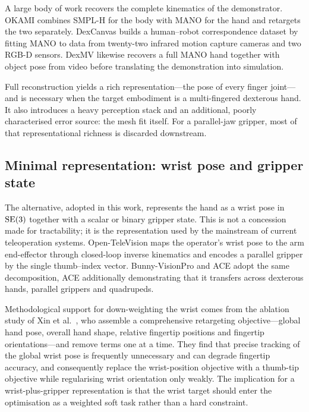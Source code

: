 A large body of work recovers the complete kinematics of the demonstrator.
OKAMI \cite{okami} combines SMPL-H for the body with MANO for the hand and
retargets the two separately. DexCanvas \cite{dexcanvas} builds a human--robot
correspondence dataset by fitting MANO to data from twenty-two infrared motion
capture cameras and two RGB-D sensors. DexMV \cite{dexmv} likewise recovers a
full MANO hand together with object pose from video before translating the
demonstration into simulation.

Full reconstruction yields a rich representation---the pose of every finger
joint---and is necessary when the target embodiment is a multi-fingered
dexterous hand. It also introduces a heavy perception stack and an additional,
poorly characterised error source: the mesh fit itself. For a parallel-jaw
gripper, most of that representational richness is discarded downstream.

\subsection{Minimal representation: wrist pose and gripper state}

The alternative, adopted in this work, represents the hand as a wrist pose in
$\mathrm{SE}(3)$ together with a scalar or binary gripper state. This is not a concession
made for tractability; it is the representation used by the mainstream of
current teleoperation systems. Open-TeleVision \cite{opentv} maps the operator's
wrist pose to the arm end-effector through closed-loop inverse kinematics and
encodes a parallel gripper by the single thumb--index vector. Bunny-VisionPro
\cite{bunny} and ACE \cite{ace} adopt the same decomposition, ACE additionally
demonstrating that it transfers across dexterous hands, parallel grippers and
quadrupeds.

Methodological support for down-weighting the wrist comes from the ablation
study of Xin et al.\ \cite{keyobj}, who assemble a comprehensive retargeting
objective---global hand pose, overall hand shape, relative fingertip positions
and fingertip orientations---and remove terms one at a time. They find that
precise tracking of the global wrist pose is frequently unnecessary and can
degrade fingertip accuracy, and consequently replace the wrist-position
objective with a thumb-tip objective while regularising wrist orientation only
weakly. The implication for a wrist-plus-gripper representation is that the
wrist target should enter the optimisation as a weighted soft task rather than
a hard constraint.


